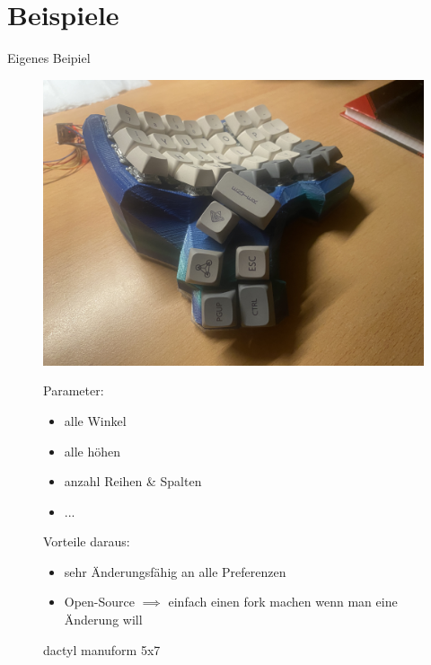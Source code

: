 \documentclass{beamer}
\begin{document}
\section{Beispiele}
\begin{frame}{Eigenes Beipiel}
   \begin{figure}[H]
       \begin{minipage}{0.5\textwidth}
           \centering
           \vfill
           \includegraphics[width=\linewidth]{figures/dactyl.JPG}
           \caption{dactyl manuform 5x7}
       \end{minipage}
       \hfill
       \begin{minipage}{0.45\textwidth}
           Parameter:
           \begin{itemize}
               \item alle Winkel
               \item alle h\"ohen
               \item anzahl Reihen \& Spalten
               \item ...
           \end{itemize}

           Vorteile daraus:
           \begin{itemize}
               \item sehr \"Anderungsf\"ahig an alle Preferenzen
               \item Open-Source $\implies$ einfach einen fork machen wenn man eine \"Anderung will
           \end{itemize}
       \end{minipage}
    \end{figure}
    
\end{frame}
\end{document}
